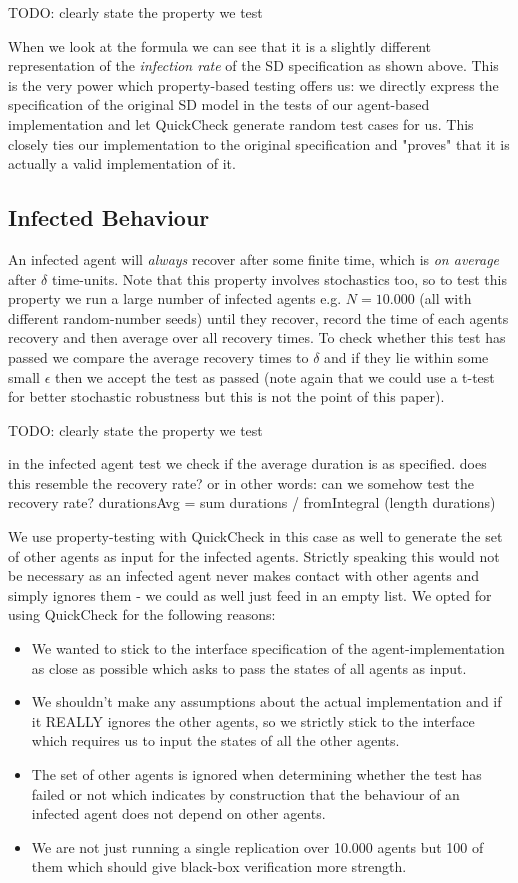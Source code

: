 TODO: clearly state the property we test

When we look at the formula we can see that it is a slightly different representation of the \textit{infection rate} of the SD specification as shown above. This is the very power which property-based testing offers us: we directly express the specification of the original SD model in the tests of our agent-based implementation and let QuickCheck generate random test cases for us. This closely ties our implementation to the original specification and "proves" that it is actually a valid implementation of it.

\subsection{Infected Behaviour}
An infected agent will \textit{always} recover after some finite time, which is \textit{on average} after $\delta$ time-units. Note that this property involves stochastics too, so to test this property we run a large number of infected agents e.g. $N = 10.000$ (all with different random-number seeds) until they recover, record the time of each agents recovery and then average over all recovery times. To check whether this test has passed we compare the average recovery times to $\delta$ and if they lie within some small $\epsilon$ then we accept the test as passed (note again that we could use a t-test for better stochastic robustness but this is not the point of this paper).

TODO: clearly state the property we test

in the infected agent test we check if the average duration is as specified. does this resemble the recovery rate? or in other words: can we somehow test the recovery rate?
durationsAvg = sum durations / fromIntegral (length durations)

We use property-testing with QuickCheck in this case as well to generate the set of other agents as input for the infected agents. Strictly speaking this would not be necessary as an infected agent never makes contact with other agents and simply ignores them - we could as well just feed in an empty list. We opted for using QuickCheck for the following reasons:

\begin{itemize}
	\item We wanted to stick to the interface specification of the agent-implementation as close as possible which asks to pass the states of all agents as input.
	\item We shouldn't make any assumptions about the actual implementation and if it REALLY ignores the other agents, so we strictly stick to the interface which requires us to input the states of all the other agents.
	\item The set of other agents is ignored when determining whether the test has failed or not which indicates by construction that the behaviour of an infected agent does not depend on other agents.
	\item We are not just running a single replication over 10.000 agents but 100 of them which should give black-box verification more strength.
\end{itemize}

